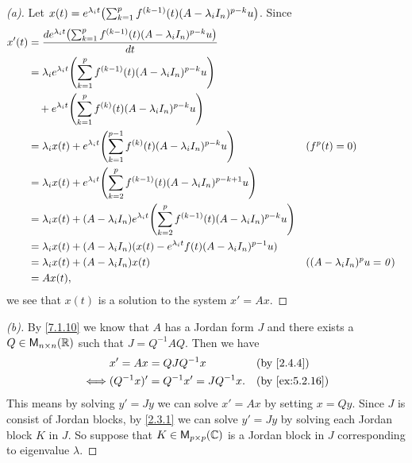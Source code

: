 \begin{proof}[(a)]
  Let \(x(t) = e^{\lambda_i t} \pa{\sum_{k = 1}^p f^{(k - 1)}(t) (A - \lambda_i I_n)^{p - k} u}\).
  Since
  \begin{align*}
    x'(t) & = \dfrac{d e^{\lambda_i t} \pa{\sum_{k = 1}^p f^{(k - 1)}(t) (A - \lambda_i I_n)^{p - k} u}}{dt}                                                             \\
          & = \lambda_i e^{\lambda_i t} \pa{\sum_{k = 1}^p f^{(k - 1)}(t) (A - \lambda_i I_n)^{p - k} u}                                                                 \\
          & \quad + e^{\lambda_i t} \pa{\sum_{k = 1}^p f^{(k)}(t) (A - \lambda_i I_n)^{p - k} u}                                                                         \\
          & = \lambda_i x(t) + e^{\lambda_i t} \pa{\sum_{k = 1}^{p - 1} f^{(k)}(t) (A - \lambda_i I_n)^{p - k} u}                   &  & (f^p(t) = 0)                    \\
          & = \lambda_i x(t) + e^{\lambda_i t} \pa{\sum_{k = 2}^p f^{(k - 1)}(t) (A - \lambda_i I_n)^{p - k + 1} u}                                                      \\
          & = \lambda_i x(t) + (A - \lambda_i I_n) e^{\lambda_i t} \pa{\sum_{k = 2}^p f^{(k - 1)}(t) (A - \lambda_i I_n)^{p - k} u}                                      \\
          & = \lambda_i x(t) + (A - \lambda_i I_n) (x(t) - e^{\lambda_i t} f(t) (A - \lambda_i I_n)^{p - 1} u)                                                           \\
          & = \lambda_i x(t) + (A - \lambda_i I_n) x(t)                                                                             &  & ((A - \lambda_i I_n)^p u = \zv) \\
          & = A x(t),
  \end{align*}
  we see that \(x(t)\) is a solution to the system \(x' = Ax\).
\end{proof}

\begin{proof}[(b)]
  By \cref{7.1.10} we know that \(A\) has a Jordan form \(J\) and there exists a \(Q \in \ms[n][n][\R]\) such that \(J = Q^{-1} A Q\).
  Then we have
  \begin{align*}
         & x' = Ax = Q J Q^{-1} x                &  & \by{2.4.4}     \\
    \iff & (Q^{-1} x)' = Q^{-1} x' = J Q^{-1} x. &  & \by{ex:5.2.16}
  \end{align*}
  This means by solving \(y' = J y\) we can solve \(x' = Ax\) by setting \(x = Q y\).
  Since \(J\) is consist of Jordan blocks, by \cref{2.3.1} we can solve \(y' = Jy\) by solving each Jordan block \(K\) in \(J\).
  So suppose that \(K \in \ms[p][p][\C]\) is a Jordan block in \(J\) corresponding to eigenvalue \(\lambda\).
\end{proof}
